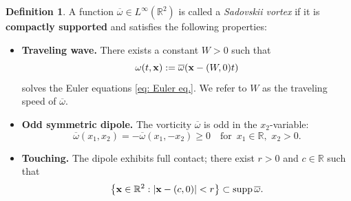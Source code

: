 \documentclass[10pt,a4paper]{amsart}
\theoremstyle{definition}
\newtheorem{definition}[theorem]{Definition}
\theoremstyle{definition}
\numberwithin{equation}{section}
\newcommand{\supp}{{\mathrm{supp}}\,}
\newcommand{\0}{\emptyset}
\newcommand{\bfx}{{\bf x}}
\newcommand{\bbR}{\mathbb R}
\begin{document}
\setcounter{section}{1}
\setcounter{equation}{1}
\setcounter{theorem}{0}
	\begin{definition}\label{def: Sadovskii vortex}
		A function $\overline{\omega} \in L^\infty(\bbR^2)$ is called a \textit{Sadovskii vortex} if it is \textbf{compactly supported} and satisfies the following properties:
		\begin{itemize}[itemsep=1em, topsep=1em]
			\item[(i)] \textbf{Traveling wave.} 
			There exists a constant $W > 0$ such that  
			\[
			\omega(t, \bfx) := \overline{\omega}(\bfx - (W, 0)t)
			\]
			solves the Euler equations \eqref{eq: Euler eq.}.  
			We refer to $W$ as the traveling speed of $\overline{\omega}$.
			
			\item[(ii)] \textbf{Odd symmetric dipole.}
			The vorticity $\overline{\omega}$ is odd in the $x_2$-variable:
			\[
			\overline{\omega}(x_1, x_2) = -\overline{\omega}(x_1, -x_2) \geq 0 
			\quad \mbox{for }\, x_1 \in \bbR, \,\, x_2 > 0.
			\]
			
			\item[(iii)] \textbf{Touching.} The dipole exhibits full contact; there exist $r > 0$ and $c \in \bbR$ such that  
			\begin{equation}\label{touching_scale}
			\left\{ \bfx \in \bbR^2 : |\bfx - (c, 0)| < r \right\} \subset \supp \overline{\omega}.
			\end{equation}
		\end{itemize}
	\end{definition}
\end{document}
